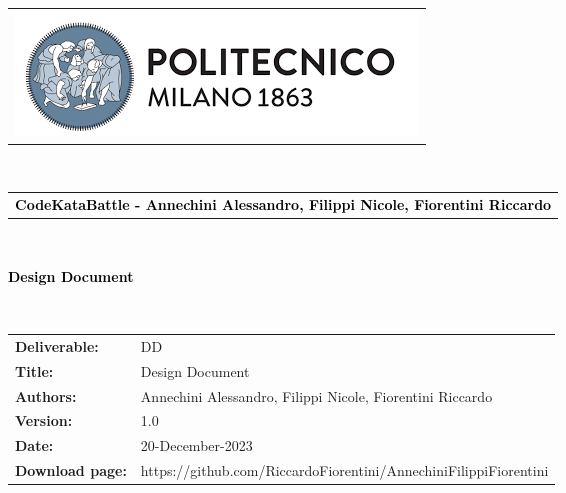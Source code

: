 


\begin{titlepage}

{\begin{table}[t!]
\centering
\begin{tabu} to \textwidth { X[3,c,m]}
    \includegraphics[scale=0.5]{Images/PolimiLogo} 
\end{tabu}
~\\ [2cm]
\begin{tabu} to \textwidth {X[2,l,m] }
    \textcolor{Black}{\textbf{\small{CodeKataBattle - Annechini Alessandro, Filippi Nicole, Fiorentini Riccardo}}}
\end{tabu}
\end{table}}~\\ [5cm]


\begin{flushleft}
\centering
{\textcolor{Black}{\textbf{\Huge{Design Document}}}} \\ [1cm]
\end{flushleft}

~\\[2cm]

\begin{table}[h!]
\begin{tabu} to \textwidth { X[0.22,r,p] X[0.75,l,p] }
\hline

\textbf{Deliverable:} & DD\\
\textbf{Title:} & Design Document \\
\textbf{Authors:} & Annechini Alessandro, Filippi Nicole, Fiorentini Riccardo\\
\textbf{Version:} & 1.0 \\ 
\textbf{Date:} & 20-December-2023 \\
\textbf{Download page:} & https://github.com/RiccardoFiorentini/AnnechiniFilippiFiorentini \\
\hline
\end{tabu}
\end{table}

\end{titlepage}




